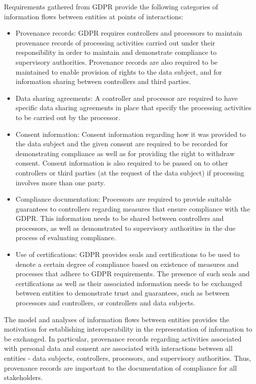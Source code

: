 Requirements gathered from GDPR \cite{pandit_exploration_2018} provide the following categories of information flows between entities at points of interactions:
\begin{itemize}
    \item Provenance records: GDPR requires controllers and processors to maintain provenance records of processing activities carried out under their responsibility in order to maintain and demonstrate compliance to supervisory authorities. Provenance records are also required to be maintained to enable provision of rights to the data subject, and for information sharing between controllers and third parties.
    \item Data sharing agreements: A controller and processor are required to have specific data sharing agreements in place that specify the processing activities to be carried out by the processor. 
    \item Consent information: Consent information regarding how it was provided to the data subject and the given consent are required to be recorded for demonstrating compliance as well as for providing the right to withdraw consent. Consent information is also required to be passed on to other controllers or third parties (at the request of the data subject) if processing involves more than one party.
    \item Compliance documentation: Processors are required to provide suitable guarantees to controllers regarding measures that ensure compliance with the GDPR. This information needs to be shared between controllers and processors, as well as demonstrated to supervisory authorities in the due process of evaluating compliance.
    \item Use of certifications: GDPR provides seals and certifications to be used to denote a certain degree of compliance based on existence of measures and processes that adhere to GDPR requirements. The presence of such seals and certifications as well as their associated information needs to be exchanged between entities to demonstrate trust and guarantees, such as between processors and controllers, or controllers and data subjects.
\end{itemize}

The model and analyses of information flows between entities provides the motivation for establishing interoperability in the representation of information to be exchanged. In particular, provenance records regarding activities associated with personal data and consent are associated with interactions between all entities - data subjects, controllers, processors, and supervisory authorities. Thus, provenance records are important to the documentation of compliance for all stakeholders. 

